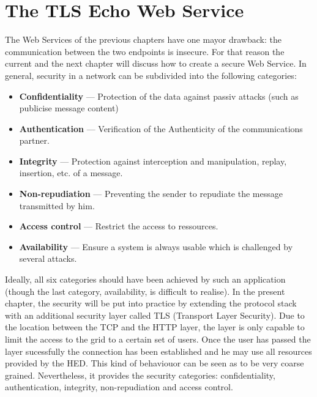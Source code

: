 \chapter{The TLS Echo Web Service}

The Web Services of the previous chapters have one mayor drawback: the communication between the two endpoints is insecure.
For that reason the current and the next chapter will discuss how to create a secure Web Service.
In general, security in a network can be subdivided into the following categories:~\cite{TANNENBAUM_2001}
\begin{itemize}
	\item \textbf{Confidentiality} --- Protection of the data against passiv attacks (such as publicise message content)
	
	\item \textbf{Authentication} --- Verification of the Authenticity  of the communications partner.

	\item \textbf{Integrity} --- Protection against interception and manipulation, replay, insertion, etc.  of a message.

	\item \textbf{Non-repudiation} --- Preventing the sender to repudiate the message transmitted by him.

	\item \textbf{Access control} --- Restrict the access to ressources.

	\item \textbf{Availability} --- Ensure a system is always usable which is challenged by several attacks.

\end{itemize}
%
Ideally, all six categories should have been achieved by such an application (though the last category, availability, is difficult to realise).
In the present chapter, the security will be put into practice by extending the protocol stack with an additional security layer called TLS (Transport Layer Security).
Due to the location between the TCP and the HTTP layer, the layer is only capable to limit the access to the grid to a certain set of users. Once the user has passed the layer sucessfully the connection has been established and he may use all resources provided by the HED. This kind of behaviouor can be seen as to be very coarse grained.
Nevertheless, it provides the security categories: confidentiality, authentication, integrity, non-repudiation and access control.\\


